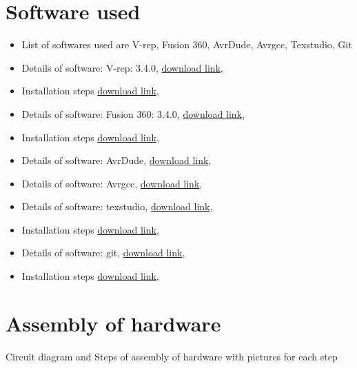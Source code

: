 \documentclass[a4paper,12pt,oneside]{book}
\begin{document}
\section{Software used}
\begin{itemize}
  \item List of softwares used are V-rep, Fusion 360, AvrDude, Avrgcc, Texstudio, Git 
  \item Details of software: V-rep: 3.4.0, \href{http://www.coppeliarobotics.com/}{download link}, 
  \item Installation steps \href{http://www.coppeliarobotics.com/resources.html}{download link},
  \item Details of software: Fusion 360: 3.4.0, \href{https://www.autodesk.com/products/fusion-360/students-teachers-educators}{download link},
  \item Installation steps \href{https://www.autodesk.com/products/fusion-360/students-teachers-educators}{download link},
  \item Details of software: AvrDude, \href{http://www.nongnu.org/avrdude/}{download link},
  \item Details of software: Avrgcc, \href{https://gcc.gnu.org/wiki/avr-gcc}{download link},
  \item Details of software: texstudio, \href{http://www.texstudio.org/}{download link},
  \item Installation steps \href{http://www.texstudio.org/}{download link},
  \item Details of software: git, \href{https://git-scm.com/}{download link},
  \item Installation steps \href{https://git-scm.com/}{download link},
\end{itemize}

\newpage

\section{Assembly of hardware}
Circuit diagram and Steps of assembly of hardware with pictures for each step
\end{document}
